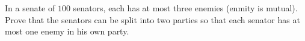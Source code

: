 In a senate of $100$ senators, each has at most three enemies (enmity is mutual). Prove that the senators can be split into two parties so that each senator has at most one enemy in his own party.
